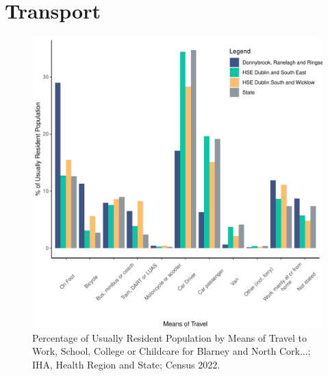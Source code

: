 \documentclass{article}
\begin{document}
\section{Transport}\label{sect:Trans}
\begin{figure}[H]
	\centering
	\includegraphics[width = 120mm]{../figures/TravelED.pdf}
	\caption{Percentage of Usually Resident Population by Means of Travel to Work, School, College or Childcare for Blarney and North Cork...; IHA, Health Region and State; Census 2022.}
	\label{fig:vbnv}
	\end{figure}
\end{document}
